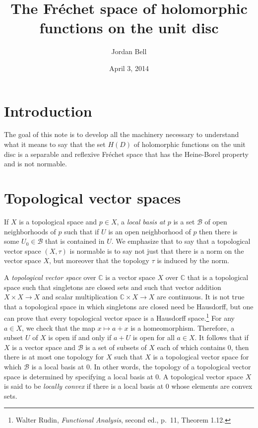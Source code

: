 \documentclass{article}
\begin{document}
\title{The  Fr\'echet space of holomorphic functions on the unit disc}
\author{Jordan Bell}
\date{April 3, 2014}
\maketitle

\section{Introduction}
The goal of this note is to develop all the machinery necessary to understand what it means to say that the set $H(D)$ of holomorphic
functions on the unit disc is a separable and reflexive Fr\'echet space that has the Heine-Borel property and is not normable.



\section{Topological vector spaces}
If $X$ is a topological space and $p \in X$, a {\em local basis at $p$} is a set $\mathscr{B}$ of open neighborhoods of $p$ such that if $U$ is an open neighborhood of 
$p$ then there is some $U_0 \in \mathscr{B}$ that is contained in $U$. 
We emphasize that to say that a topological vector space $(X,\tau)$ is normable is to say not just that there
is a norm on the vector space $X$, but moreover that the topology $\tau$ is induced by the norm.

A {\em topological vector space} over $\mathbb{C}$ is a vector space $X$  over $\mathbb{C}$ that is a  topological space such that singletons are closed sets and such that
vector addition $X \times X \to X$ and scalar multiplication $\mathbb{C} \times X \to X$ are continuous. It is not true that a topological space in which singletons are closed need be
Hausdorff, but one can prove that every topological vector space is a Hausdorff space.\footnote{Walter Rudin, {\em Functional Analysis}, second ed., p.~11, Theorem 1.12.}
For any $a \in X$, we check that the map $x \mapsto a+x$ is a homeomorphism. Therefore, a subset $U$ of $X$ is open if and only if 
$a+U$ is open for all $a \in X$. 
It follows that if $X$ is a vector space and $\mathscr{B}$ is a set of subsets of $X$ each of which contains $0$, then there is at most
one topology for $X$ such that $X$ is a topological vector space for which $\mathscr{B}$ is a local basis at $0$. In other words, the topology of a topological vector space
is determined by specifying a local basis at $0$.
A topological vector space $X$ is said to be {\em locally convex} if there is a local basis at $0$ whose elements are convex sets.
\end{document}
